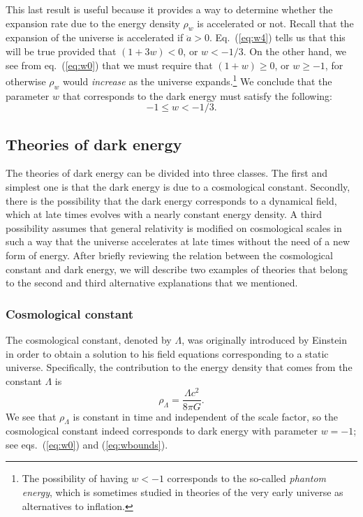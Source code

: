 \documentclass[11pt, a4paper,oneside,openright]{book}
\numberwithin{equation}{section}
\begin{document}
This last result is useful because it provides a way to determine whether the expansion rate due to the energy density $\rho_w$ is accelerated or not. Recall that the expansion of the universe is accelerated if $\ddot{a}>0$. Eq.\ (\ref{eq:w4}) tells us that this will be true provided that $(1+3w)<0$, or $w<-1/3$. On the other hand, we see from eq.\ (\ref{eq:w0}) that we must require that $(1+w)\geq0$, or $w\geq-1$, for otherwise $\rho_w$ would {\it increase} as the universe expands.\footnote{The possibility of having $w<-1$ corresponds to the so-called {\it phantom energy}, which is sometimes studied in theories of the very early universe as alternatives to inflation.} We conclude that the parameter $w$ that corresponds to the dark energy must satisfy the following:
\begin{equation} \label{eq:wbounds}
-1\leq w <-1/3.
\end{equation}

\subsection{Theories of dark energy}

The theories of dark energy can be divided into three classes. The first and simplest one is that the dark energy is due to a cosmological constant. Secondly, there is the possibility that the dark energy corresponds to a dynamical field, which at late times evolves with a nearly constant energy density. A third possibility assumes that general relativity is modified on cosmological scales in such a way that the universe accelerates at late times without the need of a new form of energy. After briefly reviewing the relation between the cosmological constant and dark energy, we will describe two examples of theories that belong to the second and third alternative explanations that we mentioned.

\subsubsection{Cosmological constant}

The cosmological constant, denoted by $\Lambda$, was originally introduced by Einstein in order to obtain a solution to his field equations corresponding to a static universe. Specifically, the contribution to the energy density that comes from the constant $\Lambda$ is
\begin{equation}
\rho_{\Lambda}=\frac{\Lambda c^2}{8\pi G}.
\end{equation}
We see that $\rho_{\Lambda}$ is constant in time and independent of the scale factor, so the cosmological constant indeed corresponds to dark energy with parameter $w=-1$; see eqs.\ (\ref{eq:w0}) and (\ref{eq:wbounds}).
\end{document}
